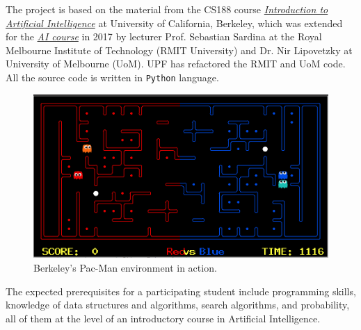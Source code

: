 \documentclass[11pt]{article}
\begin{document}
The project is based on the material from the CS188 course \href{http://ai.berkeley.edu/contest.html}{\emph{Introduction to Artificial Intelligence}} at University of California, Berkeley, which was extended for the \href{https://github.com/AI4EDUC/pacman-contest-cluster}{\emph{AI course}} in 2017 by lecturer Prof. Sebastian Sardina at the Royal Melbourne Institute of Technology (RMIT University) and Dr. Nir Lipovetzky at University of Melbourne (UoM). 
UPF has refactored the RMIT and UoM code. All the source code is written in \texttt{Python} language.

\begin{figure}[h!]
    \center 
    \includegraphics[width =.8\textwidth]{pacman.png} 
    \caption{Berkeley's Pac-Man environment in action.}
\end{figure}

The expected prerequisites for a participating student include programming skills, knowledge of data structures and algorithms, search algorithms, and probability, all of them at the level of an introductory course in Artificial Intelligence. 
\end{document}
